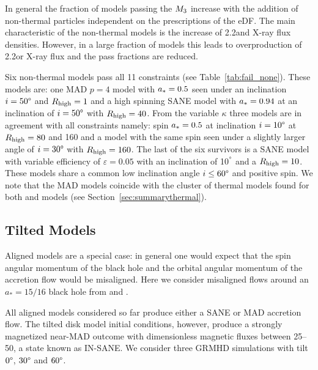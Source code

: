 In general the fraction of models passing the $M_{3}$ increase with the addition of non-thermal particles independent on the prescriptions of the eDF.  The main characteristic of the non-thermal models is the increase of 2.2\um and X-ray flux densities. However, in a large fraction of models this leads to overproduction of 2.2\um or X-ray flux and the pass fractions are reduced.



Six non-thermal models pass all 11 constraints (see Table~\ref{tab:fail_none}).
These models are:
one \hamr MAD $p=4$ model with $a_*=0.5$ seen under an inclination $i=50\degree$ and
$R_\mathrm{high}=1$ and a high spinning SANE model with $a_*=0.94$ at an inclination of $i=50\degree$ with $R_\mathrm{high}=40$.
From the \bhac variable $\kappa$ three models are in agreement with all constraints namely: spin $a_*=0.5$ at inclination $i=10\degree$ at $R_\mathrm{high}=80$ and 160 and a model with the same spin seen under a slightly larger angle of $i=30\degree$ with $R_\mathrm{high}=160$.
The last of the six survivors is a \bhac SANE model with variable efficiency of $\varepsilon=0.05$ with an inclination of 10$^\degree$ and a $R_\mathrm{high}=10$.
These models share a common low inclination angle $i \leq 60\degree$ and positive spin.
We note that the MAD models coincide with the cluster of thermal models found for both \bhac and \kharma models (see Section~\ref{sec:summarythermal}).




\subsection{Tilted Models}

Aligned models are a special case: in general one would expect that the spin angular momentum of the black hole and the orbital angular momentum of the accretion flow would be misaligned.
Here we consider misaligned flows around an $a_*=15/16$ black hole from \citet{Liska2018} and \citet{Chatterjee2020}.

All aligned models considered so far produce either a SANE or MAD accretion flow.
The tilted disk model initial conditions, however, produce a strongly magnetized near-MAD outcome with dimensionless magnetic fluxes between 25--50, a state known as IN-SANE.
We consider three GRMHD simulations with tilt $0\degree$, $30\degree$ and $60\degree$.

